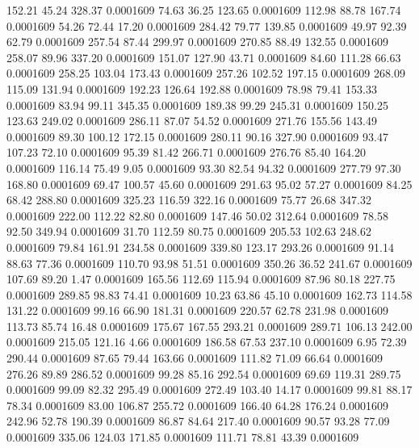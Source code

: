  152.21   45.24  328.37   0.0001609
  74.63   36.25  123.65   0.0001609
 112.98   88.78  167.74   0.0001609
  54.26   72.44   17.20   0.0001609
 284.42   79.77  139.85   0.0001609
  49.97   92.39   62.79   0.0001609
 257.54   87.44  299.97   0.0001609
 270.85   88.49  132.55   0.0001609
 258.07   89.96  337.20   0.0001609
 151.07  127.90   43.71   0.0001609
  84.60  111.28   66.63   0.0001609
 258.25  103.04  173.43   0.0001609
 257.26  102.52  197.15   0.0001609
 268.09  115.09  131.94   0.0001609
 192.23  126.64  192.88   0.0001609
  78.98   79.41  153.33   0.0001609
  83.94   99.11  345.35   0.0001609
 189.38   99.29  245.31   0.0001609
 150.25  123.63  249.02   0.0001609
 286.11   87.07   54.52   0.0001609
 271.76  155.56  143.49   0.0001609
  89.30  100.12  172.15   0.0001609
 280.11   90.16  327.90   0.0001609
  93.47  107.23   72.10   0.0001609
  95.39   81.42  266.71   0.0001609
 276.76   85.40  164.20   0.0001609
 116.14   75.49    9.05   0.0001609
  93.30   82.54   94.32   0.0001609
 277.79   97.30  168.80   0.0001609
  69.47  100.57   45.60   0.0001609
 291.63   95.02   57.27   0.0001609
  84.25   68.42  288.80   0.0001609
 325.23  116.59  322.16   0.0001609
  75.77   26.68  347.32   0.0001609
 222.00  112.22   82.80   0.0001609
 147.46   50.02  312.64   0.0001609
  78.58   92.50  349.94   0.0001609
  31.70  112.59   80.75   0.0001609
 205.53  102.63  248.62   0.0001609
  79.84  161.91  234.58   0.0001609
 339.80  123.17  293.26   0.0001609
  91.14   88.63   77.36   0.0001609
 110.70   93.98   51.51   0.0001609
 350.26   36.52  241.67   0.0001609
 107.69   89.20    1.47   0.0001609
 165.56  112.69  115.94   0.0001609
  87.96   80.18  227.75   0.0001609
 289.85   98.83   74.41   0.0001609
  10.23   63.86   45.10   0.0001609
 162.73  114.58  131.22   0.0001609
  99.16   66.90  181.31   0.0001609
 220.57   62.78  231.98   0.0001609
 113.73   85.74   16.48   0.0001609
 175.67  167.55  293.21   0.0001609
 289.71  106.13  242.00   0.0001609
 215.05  121.16    4.66   0.0001609
 186.58   67.53  237.10   0.0001609
   6.95   72.39  290.44   0.0001609
  87.65   79.44  163.66   0.0001609
 111.82   71.09   66.64   0.0001609
 276.26   89.89  286.52   0.0001609
  99.28   85.16  292.54   0.0001609
  69.69  119.31  289.75   0.0001609
  99.09   82.32  295.49   0.0001609
 272.49  103.40   14.17   0.0001609
  99.81   88.17   78.34   0.0001609
  83.00  106.87  255.72   0.0001609
 166.40   64.28  176.24   0.0001609
 242.96   52.78  190.39   0.0001609
  86.87   84.64  217.40   0.0001609
  90.57   93.28   77.09   0.0001609
 335.06  124.03  171.85   0.0001609
 111.71   78.81   43.39   0.0001609
